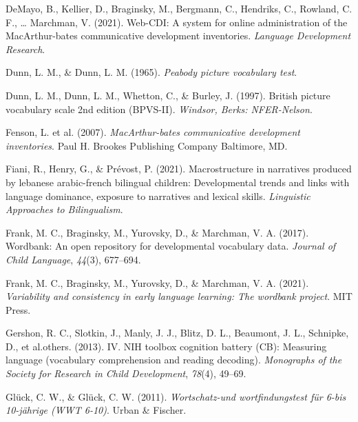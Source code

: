 \documentclass[
  man,floatsintext]{apa6}
\newlength{\cslhangindent}
\newlength{\cslentryspacingunit} %
\newenvironment{CSLReferences}[2] %
 {%
  \setlength{\parindent}{0pt}
  \ifodd #1
  \let\oldpar\par
  \def\par{\hangindent=\cslhangindent\oldpar}
  \fi
  \setlength{\parskip}{#2\cslentryspacingunit}
 }%
 {}
\begin{document}
\begin{CSLReferences}{1}{0}
\leavevmode{}%
DeMayo, B., Kellier, D., Braginsky, M., Bergmann, C., Hendriks, C., Rowland, C. F., \ldots{} Marchman, V. (2021). Web-CDI: A system for online administration of the MacArthur-bates communicative development inventories. \emph{Language Development Research}.

\leavevmode{}%
Dunn, L. M., \& Dunn, L. M. (1965). \emph{Peabody picture vocabulary test}.

\leavevmode{}%
Dunn, L. M., Dunn, L. M., Whetton, C., \& Burley, J. (1997). British picture vocabulary scale 2nd edition (BPVS-II). \emph{Windsor, Berks: NFER-Nelson}.

\leavevmode{}%
Fenson, L. et al. (2007). \emph{MacArthur-bates communicative development inventories}. Paul H. Brookes Publishing Company Baltimore, MD.

\leavevmode{}%
Fiani, R., Henry, G., \& Prévost, P. (2021). Macrostructure in narratives produced by lebanese arabic-french bilingual children: Developmental trends and links with language dominance, exposure to narratives and lexical skills. \emph{Linguistic Approaches to Bilingualism}.

\leavevmode{}%
Frank, M. C., Braginsky, M., Yurovsky, D., \& Marchman, V. A. (2017). Wordbank: An open repository for developmental vocabulary data. \emph{Journal of Child Language}, \emph{44}(3), 677--694.

\leavevmode{}%
Frank, M. C., Braginsky, M., Yurovsky, D., \& Marchman, V. A. (2021). \emph{Variability and consistency in early language learning: The wordbank project}. MIT Press.

\leavevmode{}%
Gershon, R. C., Slotkin, J., Manly, J. J., Blitz, D. L., Beaumont, J. L., Schnipke, D., et al.others. (2013). IV. NIH toolbox cognition battery (CB): Measuring language (vocabulary comprehension and reading decoding). \emph{Monographs of the Society for Research in Child Development}, \emph{78}(4), 49--69.

\leavevmode{}%
Glück, C. W., \& Glück, C. W. (2011). \emph{Wortschatz-und wortfindungstest f{ü}r 6-bis 10-j{ä}hrige (WWT 6-10)}. Urban \& Fischer.


\end{CSLReferences}
\end{document}
